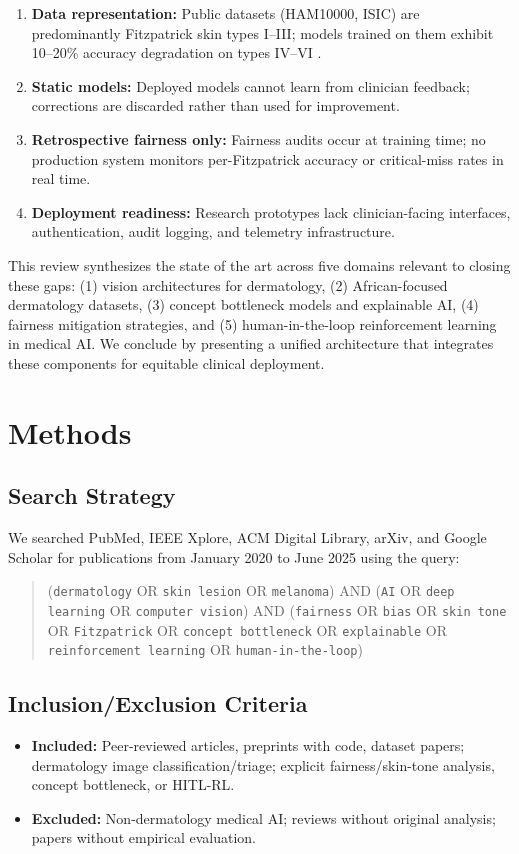 \documentclass[12pt,a4paper]{article}
\begin{document}
\begin{enumerate}
    \item \textbf{Data representation:} Public datasets (HAM10000, ISIC) are predominantly Fitzpatrick skin types I--III; models trained on them exhibit 10--20\% accuracy degradation on types IV--VI \cite{daneshjou2022disparities}.
    \item \textbf{Static models:} Deployed models cannot learn from clinician feedback; corrections are discarded rather than used for improvement.
    \item \textbf{Retrospective fairness only:} Fairness audits occur at training time; no production system monitors per-Fitzpatrick accuracy or critical-miss rates in real time.
    \item \textbf{Deployment readiness:} Research prototypes lack clinician-facing interfaces, authentication, audit logging, and telemetry infrastructure.
\end{enumerate}

This review synthesizes the state of the art across five domains relevant to closing these gaps: (1) vision architectures for dermatology, (2) African-focused dermatology datasets, (3) concept bottleneck models and explainable AI, (4) fairness mitigation strategies, and (5) human-in-the-loop reinforcement learning in medical AI. We conclude by presenting a unified architecture that integrates these components for equitable clinical deployment.

\section{Methods}
\label{sec:methods}

\subsection{Search Strategy}
We searched PubMed, IEEE Xplore, ACM Digital Library, arXiv, and Google Scholar for publications from January 2020 to June 2025 using the query:
\begin{quote}
(\texttt{dermatology} OR \texttt{skin lesion} OR \texttt{melanoma}) AND 
(\texttt{AI} OR \texttt{deep learning} OR \texttt{computer vision}) AND 
(\texttt{fairness} OR \texttt{bias} OR \texttt{skin tone} OR \texttt{Fitzpatrick} OR 
\texttt{concept bottleneck} OR \texttt{explainable} OR \texttt{reinforcement learning} OR \texttt{human-in-the-loop})
\end{quote}

\subsection{Inclusion/Exclusion Criteria}
\begin{itemize}
    \item \textbf{Included:} Peer-reviewed articles, preprints with code, dataset papers; dermatology image classification/triage; explicit fairness/skin-tone analysis, concept bottleneck, or HITL-RL.
    \item \textbf{Excluded:} Non-dermatology medical AI; reviews without original analysis; papers without empirical evaluation.
\end{itemize}
\end{document}
